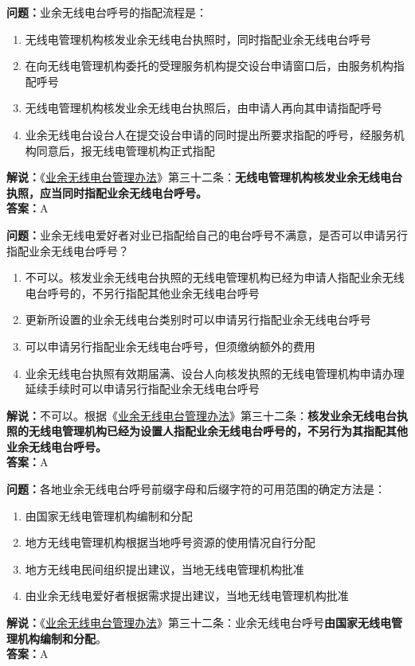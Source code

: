 \textbf{问题：}业余无线电台呼号的指配流程是：
\begin{enumerate}[label=\Alph*), leftmargin=1.5cm]
	\item 无线电管理机构核发业余无线电台执照时，同时指配业余无线电台呼号
	\item 在向无线电管理机构委托的受理服务机构提交设台申请窗口后，由服务机构指配呼号
	\item 无线电管理机构核发业余无线电台执照后，由申请人再向其申请指配呼号
	\item 业余无线电台设台人在提交设台申请的同时提出所要求指配的呼号，经服务机构同意后，报无线电管理机构正式指配
\end{enumerate}
\textbf{解说：}《\href{https://www.miit.gov.cn/jgsj/zfs/bmgz/art/2020/art_147b69815b3641caad9047735f94c860.html}{业余无线电台管理办法}》第三十二条：\textbf{无线电管理机构核发业余无线电台执照，应当同时指配业余无线电台呼号。}\\\textbf{答案：}A

\textbf{问题：}业余无线电爱好者对业已指配给自己的电台呼号不满意，是否可以申请另行指配业余无线电台呼号？
\begin{enumerate}[label=\Alph*), leftmargin=1.5cm]
	\item 不可以。核发业余无线电台执照的无线电管理机构已经为申请人指配业余无线电台呼号的，不另行指配其他业余无线电台呼号
	\item 更新所设置的业余无线电台类别时可以申请另行指配业余无线电台呼号
	\item 可以申请另行指配业余无线电台呼号，但须缴纳额外的费用
	\item 业余无线电台执照有效期届满、设台人向核发执照的无线电管理机构申请办理延续手续时可以申请另行指配业余无线电台呼号
\end{enumerate}
\textbf{解说：}不可以。根据《\href{https://www.miit.gov.cn/jgsj/zfs/bmgz/art/2020/art_147b69815b3641caad9047735f94c860.html}{业余无线电台管理办法}》第三十二条：\textbf{核发业余无线电台执照的无线电管理机构已经为设置人指配业余无线电台呼号的，不另行为其指配其他业余无线电台呼号。}\\\textbf{答案：}A

\textbf{问题：}各地业余无线电台呼号前缀字母和后缀字符的可用范围的确定方法是：
\begin{enumerate}[label=\Alph*), leftmargin=1.5cm]
	\item 由国家无线电管理机构编制和分配
	\item 地方无线电管理机构根据当地呼号资源的使用情况自行分配
	\item 地方无线电民间组织提出建议，当地无线电管理机构批准
	\item 由业余无线电爱好者根据需求提出建议，当地无线电管理机构批准
\end{enumerate}
\textbf{解说：}《\href{https://www.miit.gov.cn/jgsj/zfs/bmgz/art/2020/art_147b69815b3641caad9047735f94c860.html}{业余无线电台管理办法}》第三十二条：业余无线电台呼号\textbf{由国家无线电管理机构编制和分配}。\\\textbf{答案：}A

